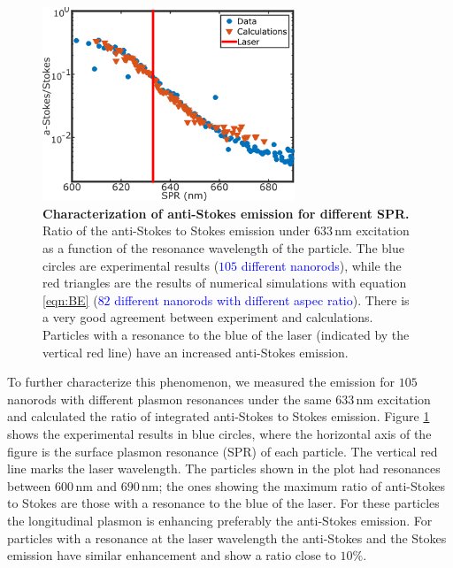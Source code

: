\documentclass[journal=nalefd,manuscript=letter]{achemso}
\newcommand{\HI}[1]{\textcolor{blue}{#1}} %
\newcommand{\nm}{\ensuremath{\,\textrm{nm}}}
\begin{document}
\begin{figure}[tp] \centering
\includegraphics[width=75.5mm]{Figures/02_AS_vs_S_SPR/02_AS_vs_S_SPR.png}
\caption{\textbf{Characterization of anti-Stokes emission for different SPR.} 
Ratio of the anti-Stokes to Stokes emission under $633\nm$ excitation
as a function of the resonance wavelength of the particle.
The blue circles are experimental results (\HI{$105$ different nanorods}), while the red triangles are the
results of numerical simulations with equation \ref{eqn:BE} (\HI{$82$ different nanorods with different 
aspec ratio}). 
There is a very good agreement between experiment and calculations. Particles with a resonance
to the blue of the laser (indicated by the vertical red line) have an increased anti-Stokes
emission.}
	\label{fig:ASS-ratio}
\end{figure}

To further characterize this phenomenon, we measured the emission for $105$
nanorods with different plasmon resonances under the same $633\nm$ excitation
and calculated the ratio of integrated anti-Stokes to Stokes emission.
Figure \ref{fig:ASS-ratio} shows the experimental results in blue circles, where
the horizontal axis of the figure is the surface plasmon resonance (SPR) of each
particle. The vertical red line marks the laser wavelength. The particles shown
in the plot had resonances between $600\nm$ and $690\nm$; the ones showing the
maximum ratio of anti-Stokes to Stokes are those with a resonance to the blue of
the laser. For these particles the longitudinal plasmon is enhancing preferably the
anti-Stokes emission. For particles with a resonance at the laser wavelength the
anti-Stokes and the Stokes emission have similar enhancement and show a ratio
close to $10\%$.
\end{document}
